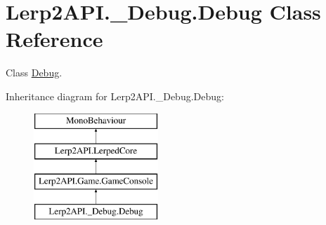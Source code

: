 \hypertarget{class_lerp2_a_p_i_1_1___debug_1_1_debug}{}\section{Lerp2\+A\+P\+I.\+\_\+\+Debug.\+Debug Class Reference}
\label{class_lerp2_a_p_i_1_1___debug_1_1_debug}


Class \hyperlink{class_lerp2_a_p_i_1_1___debug_1_1_debug}{Debug}.  


Inheritance diagram for Lerp2\+A\+P\+I.\+\_\+\+Debug.\+Debug\+:\begin{figure}[H]
\begin{center}
\leavevmode
\includegraphics[height=4.000000cm]{class_lerp2_a_p_i_1_1___debug_1_1_debug}
\end{center}
\end{figure}
